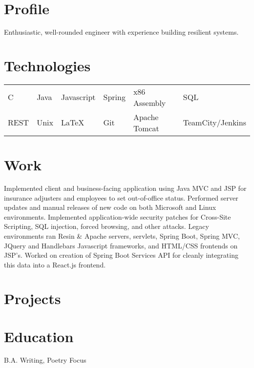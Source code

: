 \documentclass{my_cv}
\begin{document}

 \vspace{1mm}
 \vspace{1mm}

\section{Profile}
\small{Enthusiastic, well-rounded engineer with experience building resilient systems.}

\section{Technologies}
\begin{tabular}{l l l l l l}
    C & Java & Javascript & Spring & x86 Assembly & SQL\\
    REST & Unix & \LaTeX{} & Git & Apache Tomcat & TeamCity/Jenkins
\end{tabular}
 
\section{Work}
{Implemented client and business-facing application using Java MVC and JSP for insurance adjusters and employees to set out-of-office status.} 
{Performed server updates and manual releases of new code on both Microsoft and Linux environments.} 
{Implemented application-wide security patches for Cross-Site Scripting, SQL injection, forced browsing, and other attacks.}
{Legacy environments ran Resin \& Apache servers, servlets, Spring Boot, Spring MVC, JQuery and Handlebars
Javascript frameworks, and HTML/CSS frontends on JSP's.}
{Worked on creation of Spring Boot Services API for cleanly integrating this data into a React.js frontend.}

\section{Projects}

\section{Education}
B.A. Writing, Poetry Focus
\end{document}
